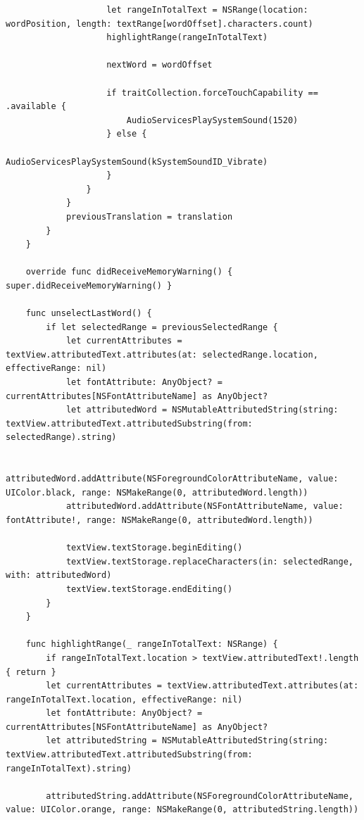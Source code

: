 \begin{lstlisting}
                    let rangeInTotalText = NSRange(location: wordPosition, length: textRange[wordOffset].characters.count)
                    highlightRange(rangeInTotalText)
                    
                    nextWord = wordOffset
                    
                    if traitCollection.forceTouchCapability == .available {
                        AudioServicesPlaySystemSound(1520)
                    } else {
                        AudioServicesPlaySystemSound(kSystemSoundID_Vibrate)
                    }
                }
            }
            previousTranslation = translation
        }
    }
    
    override func didReceiveMemoryWarning() { super.didReceiveMemoryWarning() }
    
    func unselectLastWord() {
        if let selectedRange = previousSelectedRange {
            let currentAttributes = textView.attributedText.attributes(at: selectedRange.location, effectiveRange: nil)
            let fontAttribute: AnyObject? = currentAttributes[NSFontAttributeName] as AnyObject?
            let attributedWord = NSMutableAttributedString(string: textView.attributedText.attributedSubstring(from: selectedRange).string)
            
            attributedWord.addAttribute(NSForegroundColorAttributeName, value: UIColor.black, range: NSMakeRange(0, attributedWord.length))
            attributedWord.addAttribute(NSFontAttributeName, value: fontAttribute!, range: NSMakeRange(0, attributedWord.length))
            
            textView.textStorage.beginEditing()
            textView.textStorage.replaceCharacters(in: selectedRange, with: attributedWord)
            textView.textStorage.endEditing()
        }
    }
    
    func highlightRange(_ rangeInTotalText: NSRange) {
        if rangeInTotalText.location > textView.attributedText!.length { return }
        let currentAttributes = textView.attributedText.attributes(at: rangeInTotalText.location, effectiveRange: nil)
        let fontAttribute: AnyObject? = currentAttributes[NSFontAttributeName] as AnyObject?
        let attributedString = NSMutableAttributedString(string: textView.attributedText.attributedSubstring(from: rangeInTotalText).string)
        
        attributedString.addAttribute(NSForegroundColorAttributeName, value: UIColor.orange, range: NSMakeRange(0, attributedString.length))
        

\end{lstlisting}
